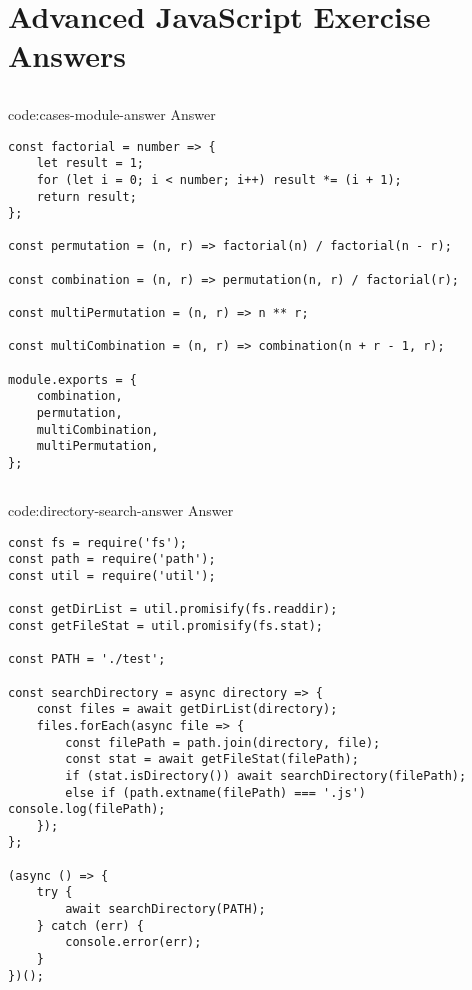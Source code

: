 \section{Advanced JavaScript Exercise Answers}\label{sect:advanced-js-answers}

\subsection*{}

\begin{codeenv}{code:cases-module-answer}{ Answer}\begin{verbatim}
const factorial = number => {
    let result = 1;
    for (let i = 0; i < number; i++) result *= (i + 1);
    return result;
};

const permutation = (n, r) => factorial(n) / factorial(n - r);

const combination = (n, r) => permutation(n, r) / factorial(r);

const multiPermutation = (n, r) => n ** r;

const multiCombination = (n, r) => combination(n + r - 1, r);

module.exports = {
    combination,
    permutation,
    multiCombination,
    multiPermutation,
};
\end{verbatim}
\end{codeenv}

\subsection*{}

\begin{codeenv}{code:directory-search-answer}{ Answer}\begin{verbatim}
const fs = require('fs');
const path = require('path');
const util = require('util');

const getDirList = util.promisify(fs.readdir);
const getFileStat = util.promisify(fs.stat);

const PATH = './test';

const searchDirectory = async directory => {
    const files = await getDirList(directory);
    files.forEach(async file => {
        const filePath = path.join(directory, file);
        const stat = await getFileStat(filePath);
        if (stat.isDirectory()) await searchDirectory(filePath);
        else if (path.extname(filePath) === '.js') console.log(filePath);
    });
};

(async () => {
    try {
        await searchDirectory(PATH);
    } catch (err) {
        console.error(err);
    }
})();
\end{verbatim}
\end{codeenv}
